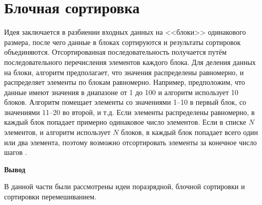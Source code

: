 \section{Блочная сортировка}
Идея заключается в  разбиении входных данных на <<блоки>> одинакового размера, после чего данные в блоках сортируются и результаты сортировок объединяются.
Отсортированная последовательность получается путём последовательного перечисления элементов каждого блока.
Для деления данных на блоки, алгоритм предполагает, что значения  распределены равномерно, и распределяет элементы по блокам равномерно. Например, предположим, что данные имеют значения в диапазоне от 1 до 100 и алгоритм использует 10 блоков. Алгоритм помещает элементы со значениями 1--10 в первый блок, со значениями 11--20  во второй, и т.д.
Если элементы распределены равномерно, в каждый блок попадает примерно одинаковое число элементов. Если в списке $N$ элементов, и алгоритм использует $N$ блоков, в каждый блок попадает всего один или два элемента, поэтому возможно отсортировать элементы за конечное число шагов \cite{article_sorts}.






\textbf{Вывод}


В данной части были рассмотрены идеи поразрядной, блочной сортировки и сортировки перемешиванием.
